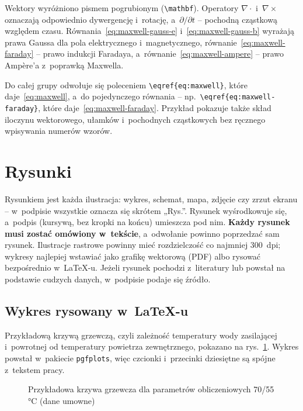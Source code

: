 Wektory wyróżniono pismem pogrubionym (\verb|\mathbf|).
Operatory $\nabla\cdot$ i~$\nabla\times$ oznaczają odpowiednio dywergencję
i~rotację, a~$\partial/\partial t$ -- pochodną cząstkową względem czasu.
Równania~\eqref{eq:maxwell-gauss-e} i~\eqref{eq:maxwell-gauss-b} wyrażają
prawa Gaussa dla pola elektrycznego i~magnetycznego,
równanie~\eqref{eq:maxwell-faraday} -- prawo indukcji Faradaya,
a~równanie~\eqref{eq:maxwell-ampere} -- prawo Ampère'a z~poprawką Maxwella.

Do całej grupy odwołuje się poleceniem \verb|\eqref{eq:maxwell}|,
które daje~\eqref{eq:maxwell}, a~do pojedynczego równania -- np.\
\verb|\eqref{eq:maxwell-faraday}|, które daje~\eqref{eq:maxwell-faraday}.
Przykład pokazuje także skład iloczynu wektorowego, ułamków i~pochodnych
cząstkowych bez ręcznego wpisywania numerów wzorów.

\section{Rysunki}
\label{sec:rysunki}

Rysunkiem jest każda ilustracja: wykres, schemat, mapa, zdjęcie czy zrzut
ekranu -- w~podpisie wszystkie oznacza się skrótem „Rys.”. Rysunek
wyśrodkowuje się, a~podpis (kursywą, bez kropki na końcu) umieszcza pod
nim. \textbf{Każdy rysunek musi zostać omówiony w~tekście}, a~odwołanie
powinno poprzedzać sam rysunek. Ilustracje rastrowe powinny mieć
rozdzielczość co najmniej \qty{300}{dpi}; wykresy najlepiej wstawiać jako
grafikę wektorową (PDF) albo rysować bezpośrednio w~\LaTeX-u. Jeżeli
rysunek pochodzi z~literatury lub powstał na podstawie cudzych danych,
w~podpisie podaje się źródło.

\subsection{Wykres rysowany w~\LaTeX-u}

Przykładową krzywą grzewczą, czyli zależność temperatury wody
zasilającej i~powrotnej od temperatury powietrza zewnętrznego, pokazano na
rys.~\ref{fig:krzywa}. Wykres powstał w~pakiecie \texttt{pgfplots}, więc
czcionki i~przecinki dziesiętne są spójne z~tekstem pracy.

\begin{figure}[htbp]
  \centering
  \caption{Przykładowa krzywa grzewcza dla parametrów obliczeniowych
    70/55\,°C (dane umowne)}
  \label{fig:krzywa}
\end{figure}

